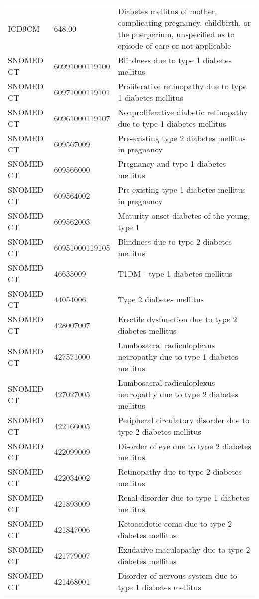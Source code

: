 \begin{table}[ht]
\begin{tabular}{lll}
  ICD9CM & 648.00 & Diabetes mellitus of mother, complicating pregnancy, childbirth, or the puerperium, unspecified as to episode of care or not applicable \\ 
  SNOMED CT & 60991000119100 & Blindness due to type 1 diabetes mellitus \\ 
  SNOMED CT & 60971000119101 & Proliferative retinopathy due to type 1 diabetes mellitus \\ 
  SNOMED CT & 60961000119107 & Nonproliferative diabetic retinopathy due to type 1 diabetes mellitus \\ 
  SNOMED CT & 609567009 & Pre-existing type 2 diabetes mellitus in pregnancy \\ 
  SNOMED CT & 609566000 & Pregnancy and type 1 diabetes mellitus \\ 
  SNOMED CT & 609564002 & Pre-existing type 1 diabetes mellitus in pregnancy \\ 
  SNOMED CT & 609562003 & Maturity onset diabetes of the young, type 1 \\ 
  SNOMED CT & 60951000119105 & Blindness due to type 2 diabetes mellitus \\ 
  SNOMED CT & 46635009 & T1DM - type 1 diabetes mellitus \\ 
  SNOMED CT & 44054006 & Type 2 diabetes mellitus \\ 
  SNOMED CT & 428007007 & Erectile dysfunction due to type 2 diabetes mellitus \\ 
  SNOMED CT & 427571000 & Lumbosacral radiculoplexus neuropathy due to type 1 diabetes mellitus \\ 
  SNOMED CT & 427027005 & Lumbosacral radiculoplexus neuropathy due to type 2 diabetes mellitus \\ 
  SNOMED CT & 422166005 & Peripheral circulatory disorder due to type 2 diabetes mellitus \\ 
  SNOMED CT & 422099009 & Disorder of eye due to type 2 diabetes mellitus \\ 
  SNOMED CT & 422034002 & Retinopathy due to type 2 diabetes mellitus \\ 
  SNOMED CT & 421893009 & Renal disorder due to type 1 diabetes mellitus \\ 
  SNOMED CT & 421847006 & Ketoacidotic coma due to type 2 diabetes mellitus \\ 
  SNOMED CT & 421779007 & Exudative maculopathy due to type 2 diabetes mellitus \\ 
  SNOMED CT & 421468001 & Disorder of nervous system due to type 1 diabetes mellitus \\ 

\end{tabular}
\end{table}
